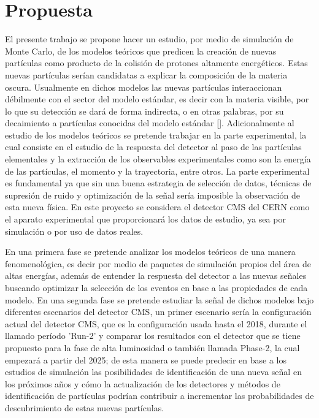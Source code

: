 \chapter{Propuesta}

El presente trabajo se propone hacer un estudio, por medio de simulación de Monte Carlo, de los modelos teóricos que predicen la creación de nuevas partículas como producto de la colisión de protones altamente energéticos. Estas nuevas partículas serían candidatas a explicar la composición de la materia oscura. Usualmente en dichos modelos las nuevas partículas interaccionan débilmente con el sector del modelo estándar, es decir con la materia visible, por lo que su detección se dará de forma indirecta, o en otras palabras, por su decaimiento a partículas conocidas del modelo estándar []. Adicionalmente al estudio de los modelos teóricos se pretende trabajar en la parte experimental, la cual consiste en el estudio de la respuesta del detector al paso de las partículas elementales y la extracción de los observables experimentales como son la energía de las partículas, el momento y la trayectoria, entre otros. La parte experimental es fundamental ya que sin una buena estrategia de selección de datos, técnicas de supresión de ruido y optimización de la señal sería imposible la observación de esta nueva física. En este proyecto se considera el detector CMS del CERN como el aparato experimental que proporcionará los datos de estudio, ya sea por simulación o por uso de datos reales.


En una primera fase se pretende analizar los modelos teóricos de una manera fenomenológica, es decir por medio de paquetes de simulación propios del área de altas energías, además de entender la respuesta del detector a las nuevas señales buscando optimizar la selección de los eventos en base a las propiedades de cada modelo. En una segunda fase se pretende estudiar la señal de dichos modelos bajo diferentes escenarios del detector CMS, un primer escenario sería la configuración actual del detector CMS, que es la configuración usada hasta el 2018, durante el llamado período 'Run-2' y comparar los resultados con el detector que se tiene propuesto para la fase de alta luminosidad o también llamada Phase-2, la cual empezará a partir del 2025; de esta manera se puede predecir en base a los estudios de simulación las posibilidades de identificación de una nueva señal en los próximos años y cómo la actualización de los detectores y métodos de identificación de
partículas podrían contribuir a incrementar las probabilidades de descubrimiento de estas nuevas partículas.

